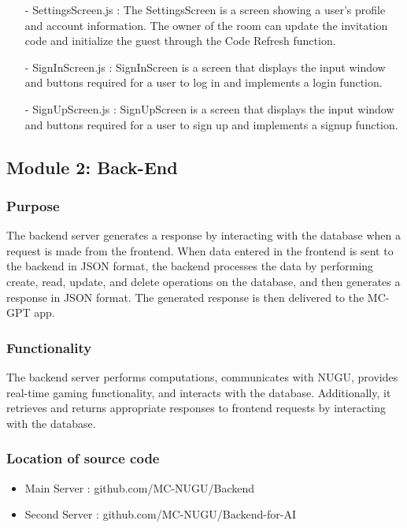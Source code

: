 \documentclass[conference]{IEEEtran}
\begin{document}
\begin{itemize}
                    \item[-] SettingsScreen.js : The SettingsScreen is a screen showing a user's profile and account information. The owner of the room can update the invitation code and initialize the guest through the Code Refresh function.
                    \item[-] SignInScreen.js : SignInScreen is a screen that displays the input window and buttons required for a user to log in and implements a login function.
                    \item[-] SignUpScreen.js : SignUpScreen is a screen that displays the input window and buttons required for a user to sign up and implements a signup function.
            \end{itemize}    
        
    \subsection{Module 2: Back-End}
        \subsubsection{Purpose} 
            The backend server generates a response by interacting with the database when a request is made from the frontend. When data entered in the frontend is sent to the backend in JSON format, the backend processes the data by performing create, read, update, and delete operations on the database, and then generates a response in JSON format. The generated response is then delivered to the MC-GPT app.\\
        \subsubsection{Functionality}
            The backend server performs computations, communicates with NUGU, provides real-time gaming functionality, and interacts with the database. Additionally, it retrieves and returns appropriate responses to frontend requests by interacting with the database.\\
        \subsubsection{Location of source code}
            \begin{itemize}
                \item Main Server : github.com/MC-NUGU/Backend
                \item Second Server : github.com/MC-NUGU/Backend-for-AI
            \end{itemize}
\end{document}
